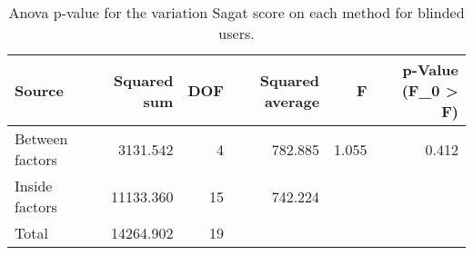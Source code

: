 
\begin{table}[!htb]
\centering
\caption{Anova p-value for the variation Sagat score on each method for blinded users.}
\label{tab:anova_sagat_var}
\begin{tabular}{lrrrrr}
\toprule
         Source &  Squared sum &  DOF & Squared average &     F & p-Value (F\_0 > F) \\
\midrule
Between factors &     3131.542 &    4 &         782.885 & 1.055 &             0.412 \\
 Inside factors &    11133.360 &   15 &         742.224 &       &                   \\
          Total &    14264.902 &   19 &                 &       &                   \\
\bottomrule
\end{tabular}
\end{table}

